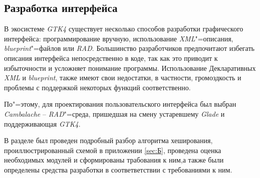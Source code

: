 \subsection{Разработка интерфейса}

В экосистеме \textit{GTK4} существует несколько способов разработки графического
интерфейса: программирование вручную, использование \textit{XML}"=описания,
\textit{blueprint}"=файлов или \textit{RAD}. Большинство разработчиков
предпочитают избегать описания интерфейса непосредственно в коде, так как это
приводит к избыточности и усложняет понимание программы. Использование
Декларативных \textit{XML} и \textit{blueprint}, также имеют свои недостатки, в
частности, громоздкость и проблемы с поддержкой некоторых функций
соответственно.

По"=этому, для проектирования пользовательского интерфейса был выбран
\textit{Cambalache} -- \textit{RAD}"=среда, пришедшая на смену устаревшему
\textit{Glade} и поддерживающая \textit{GTK4}.

\vspace{\baselineskip}

В разделе был проведен подробный разбор алгоритма хеширования,
проиллюстрированный схемой в приложении \ref{sec:Б}, проведена оценка
необходимых модулей и сформированы трабования к ним,а также были определены
средства разработки в соответветствии с требованиями к ним.

